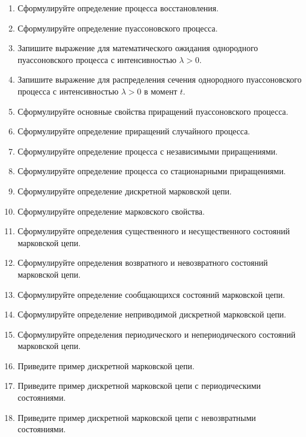 \documentclass[a4paper,12pt]{extreport}
\renewcommand{\=}[1]{\stackrel{#1}{=}} %
\begin{document}
\begin{enumerate}
	\item Сформулируйте определение процесса восстановления.
	\item Сформулируйте определение пуассоновского процесса.
	\item Запишите выражение для математического ожидания
	однородного пуассоновского процесса с интенсивностью $\lambda > 0$.
	\item Запишите выражение для распределения сечения
	однородного пуассоновского процесса с интенсивностью $\lambda > 0$
	в момент $t$.
	\item Сформулируйте основные свойства приращений пуассоновского процесса.

	\item Сформулируйте определение приращений случайного процесса.
	\item Сформулируйте определение процесса с независимыми приращениями.
	\item Сформулируйте определение процесса со стационарными приращениями.

	\item Сформулируйте определение дискретной марковской цепи.
	\item Сформулируйте определение марковского свойства.

	\item Сформулируйте определения существенного и несущественного состояний марковской цепи.
	\item Сформулируйте определения возвратного и невозвратного состояний марковской цепи.
	\item Сформулируйте определение сообщающихся состояний марковской цепи.
	\item Сформулируйте определение неприводимой дискретной марковской цепи.
	\item Сформулируйте определения периодического и непериодического состояний марковской цепи.
	\item Приведите пример дискретной марковской цепи.
	\item Приведите пример дискретной марковской цепи с периодическими состояниями.
	\item Приведите пример дискретной марковской цепи с невозвратными состояниями.


\end{enumerate}
\end{document}
